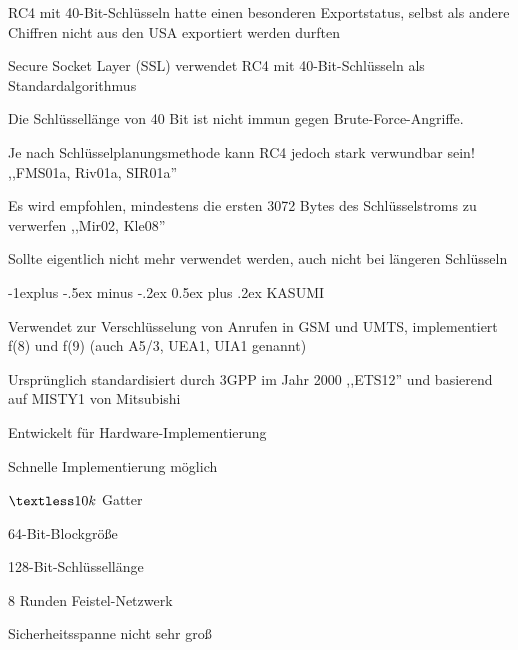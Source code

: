 \documentclass[a4paper]{article}
\makeatletter
\renewcommand{\subsection}{\@startsection{subsection}{2}{0mm}%
 {-1explus -.5ex minus -.2ex}%
 {0.5ex plus .2ex}%
 {\normalfont\normalsize\bfseries}}
\makeatother
\begin{document}
\begin{multicols}{3}
\begin{itemize*}
\begin{itemize*}
            \end{itemize*}
            \item RC4 mit 40-Bit-Schlüsseln hatte einen besonderen Exportstatus, selbst
            als andere Chiffren nicht aus den USA exportiert werden durften
            \begin{itemize*}
                  \item Secure Socket Layer (SSL) verwendet RC4 mit 40-Bit-Schlüsseln als Standardalgorithmus
                  \item Die Schlüssellänge von 40 Bit ist nicht immun gegen Brute-Force-Angriffe.
            \end{itemize*}
            \item Je nach Schlüsselplanungsmethode kann RC4 jedoch stark verwundbar
            sein! ,,FMS01a, Riv01a, SIR01a''
            \item Es wird empfohlen, mindestens die ersten 3072 Bytes des
            Schlüsselstroms zu verwerfen ,,Mir02, Kle08''
            \item Sollte eigentlich nicht mehr verwendet werden, auch nicht bei längeren
            Schlüsseln
      \end{itemize*}


      \subsection{KASUMI}

      \begin{itemize*}
            \item Verwendet zur Verschlüsselung von Anrufen in GSM und UMTS,
            implementiert f(8) und f(9) (auch A5/3, UEA1, UIA1 genannt)
            \item Ursprünglich standardisiert durch 3GPP im Jahr 2000 ,,ETS12'' und
            basierend auf MISTY1 von Mitsubishi
            \item Entwickelt für Hardware-Implementierung
            \begin{itemize*}
                  \item Schnelle Implementierung möglich
                  \item $\textless10k$ Gatter
            \end{itemize*}
            \item 64-Bit-Blockgröße
            \item 128-Bit-Schlüssellänge
            \item 8 Runden Feistel-Netzwerk
            \item Sicherheitsspanne nicht sehr groß
      \end{itemize*}


\end{multicols}
\end{document}
